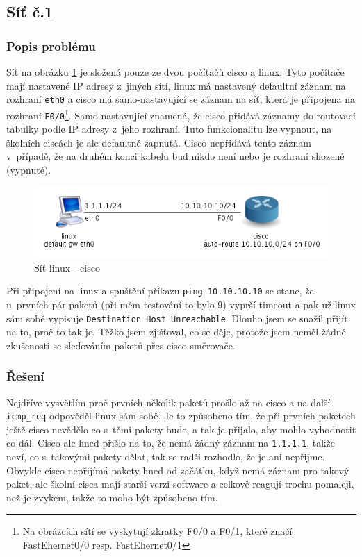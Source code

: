 
\subsection{Síť č.1}
\subsubsection{Popis problému}
Síť na obrázku \ref{fig:sit_2pc} je složená pouze ze dvou počítačů cisco a linux. Tyto počítače mají nastavené IP adresy z~jiných sítí, linux má nastavený defaultní záznam na rozhraní \verb|eth0| a cisco má samo-nastavující se záznam na síť, která je připojena na rozhraní \verb|F0/0|\footnote{Na obrázcích sítí se vyskytují zkratky F0/0 a F0/1, které značí FastEhernet0/0 resp. FastEhernet0/1}. Samo-nastavující znamená, že cisco přidává záznamy do routovací tabulky podle IP adresy z~jeho rozhraní. Tuto funkcionalitu lze vypnout, na školních ciscách je ale defaultně zapnutá. Cisco nepřidává tento záznam v~případě, že na druhém konci kabelu buď nikdo není nebo je rozhraní shozené (vypnuté).

\begin{figure}[h]
\begin{center}
\includegraphics[width=13cm]{figures/sit_2pc.png}
\caption{Síť linux - cisco}
\label{fig:sit_2pc}
\end{center}
\end{figure}

Při připojení na linux a spuštění příkazu \verb|ping 10.10.10.10| se stane, že u~prvních pár paketů (při mém testování to bylo 9) vyprší timeout a pak už linux sám sobě vypisuje \verb|Destination Host Unreachable|. Dlouho jsem se snažil přijít na to, proč to tak je. Těžko jsem zjišťoval, co se děje, protože jsem neměl žádné zkušenosti se sledováním paketů přes cisco směrovače. 

\subsubsection{Řešení} 
Nejdříve vysvětlím proč prvních několik paketů prošlo až na cisco a na další \verb|icmp_req| odpověděl linux sám sobě. Je to způsobeno tím, že při prvních paketech ještě cisco nevědělo co s~těmi pakety bude, a tak je přijalo, aby mohlo vyhodnotit co dál. Cisco ale hned přišlo na to, že nemá žádný záznam na \verb|1.1.1.1|, takže neví, co s~takovými pakety dělat, tak se radši rozhodlo, že je ani nepřijme. Obvykle cisco nepřijímá pakety hned od začátku, když nemá záznam pro takový paket, ale školní cisca mají starší verzi software a celkově reagují trochu pomaleji, než je zvykem, takže to moho být způsobeno tím.

